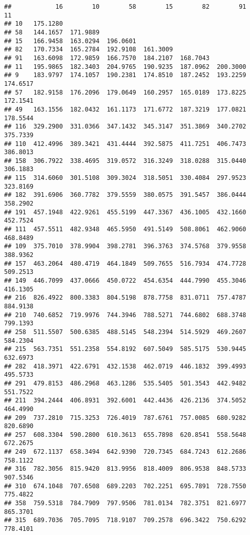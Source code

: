 \documentclass[
]{article}
\begin{document}
\begin{verbatim}
##            16        10        58        15        82        91        11
## 10   175.1280                                                            
## 58   144.1657  171.9889                                                  
## 15   166.9458  163.0294  196.0601                                        
## 82   170.7334  165.2784  192.9108  161.3009                              
## 91   163.6098  172.9859  166.7570  184.2107  168.7043                    
## 11   195.9865  182.3403  204.9765  190.9235  187.0962  200.3000          
## 9    183.9797  174.1057  190.2381  174.8510  187.2452  193.2259  174.6517
## 57   182.9158  176.2096  179.0649  160.2957  165.0189  173.8225  172.1541
## 49   163.1556  182.0432  161.1173  171.6772  187.3219  177.0821  178.5544
## 116  329.2900  331.0366  347.1432  345.3147  351.3869  340.2702  375.7339
## 110  412.4996  389.3421  431.4444  392.5875  411.7251  406.7473  386.8013
## 158  306.7922  338.4695  319.0572  316.3249  318.0288  315.0440  306.1883
## 115  314.6060  301.5108  309.3024  318.5051  330.4084  297.9523  323.8169
## 182  391.6906  360.7782  379.5559  380.0575  391.5457  386.0444  358.2902
## 191  457.1948  422.9261  455.5199  447.3367  436.1005  432.1660  452.7524
## 111  457.5511  482.9348  465.5950  491.5149  508.8061  462.9060  468.8489
## 109  375.7010  378.9904  398.2781  396.3763  374.5768  379.9558  388.9362
## 157  463.2064  480.4719  464.1849  509.7655  516.7934  474.7728  509.2513
## 149  446.7099  437.0666  450.0722  454.6354  444.7990  455.3046  416.1305
## 216  826.4922  800.3383  804.5198  878.7758  831.0711  757.4787  884.9138
## 210  740.6852  719.9976  744.3946  788.5271  744.6802  688.3748  799.1393
## 258  511.5507  500.6385  488.5145  548.2394  514.5929  469.2607  584.2304
## 215  563.7351  551.2358  554.8192  607.5049  585.5175  530.9445  632.6973
## 282  418.3971  422.6791  432.1538  462.0719  446.1832  399.4993  495.5733
## 291  479.8153  486.2968  463.1286  535.5405  501.3543  442.9482  551.7522
## 211  394.2444  406.8931  392.6001  442.4436  426.2136  374.5052  464.4990
## 209  737.2810  715.3253  726.4019  787.6761  757.0085  680.9282  820.6890
## 257  608.3304  590.2800  610.3613  655.7898  620.8541  558.5648  672.2675
## 249  672.1137  658.3494  642.9390  720.7345  684.7243  612.2686  758.1122
## 316  782.3056  815.9420  813.9956  818.4009  806.9538  848.5733  907.5346
## 310  674.1048  707.6508  689.2203  702.2251  695.7891  728.7550  775.4822
## 358  759.5318  784.7909  797.9506  781.0134  782.3751  821.6977  865.3701
## 315  689.7036  705.7095  718.9107  709.2578  696.3422  750.6292  778.4101

\end{verbatim}
\end{document}
